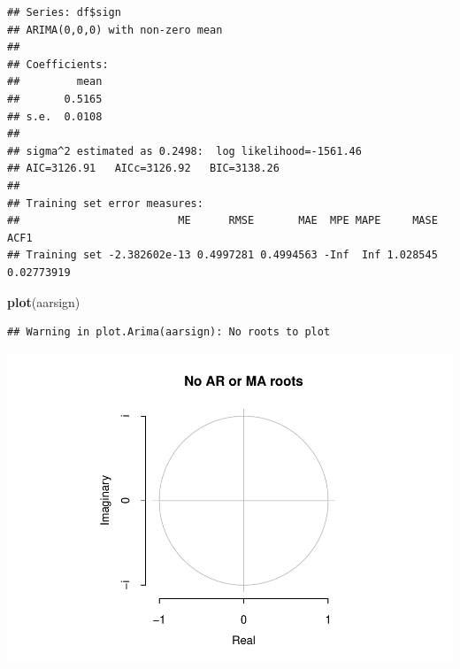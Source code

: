 \documentclass[11pt, a4paper]{report}
\newenvironment{Shaded}{\begin{snugshade}}{\end{snugshade}}
\newcommand{\KeywordTok}[1]{\textcolor[rgb]{0.13,0.29,0.53}{\textbf{#1}}}
\newcommand{\NormalTok}[1]{#1}
\newcommand{\OperatorTok}[1]{\textcolor[rgb]{0.81,0.36,0.00}{\textbf{#1}}}
\theoremstyle{plain}
\theoremstyle{plain}
\theoremstyle{remark}
\begin{document}
\begin{verbatim}
## Series: df$sign 
## ARIMA(0,0,0) with non-zero mean 
## 
## Coefficients:
##         mean
##       0.5165
## s.e.  0.0108
## 
## sigma^2 estimated as 0.2498:  log likelihood=-1561.46
## AIC=3126.91   AICc=3126.92   BIC=3138.26
## 
## Training set error measures:
##                         ME      RMSE       MAE  MPE MAPE     MASE       ACF1
## Training set -2.382602e-13 0.4997281 0.4994563 -Inf  Inf 1.028545 0.02773919
\end{verbatim}

\begin{Shaded}
\begin{Highlighting}[]
\KeywordTok{plot}\NormalTok{(aarsign)}
\end{Highlighting}
\end{Shaded}

\begin{verbatim}
## Warning in plot.Arima(aarsign): No roots to plot
\end{verbatim}

\begin{center}\includegraphics{Econo2_P1_files/figure-latex/auto arima-9} \end{center}

\begin{Shaded}
\end{Shaded}
\end{document}
